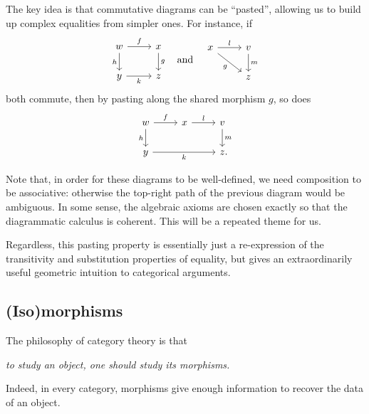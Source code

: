 The key idea is that commutative diagrams
can be ``pasted'', allowing us to build up complex equalities from simpler ones.
For instance, if
\[
  \begin{tikzcd}
    w\ar[r, "f"]\ar[d, "h"'] & x\ar[d, "g"] \\
    y\ar[r, "k"'] & z
  \end{tikzcd}\quad
  \text{and}\quad
  \begin{tikzcd}
    x\ar[r, "l"]\ar[rd, "g"'] & v\ar[d, "m"] \\
    & z
  \end{tikzcd}
\] both commute, then by pasting along the shared morphism $g$, so does
\[
  \begin{tikzcd}
    w\ar[r, "f"]\ar[d, "h"'] & x\ar[r, "l"] & v\ar[d, "m"] \\
    y\ar[rr, "k"'] && z\punctuation{.}
  \end{tikzcd}
\]

Note that, in order for these diagrams to be well-defined, we need composition
to be associative: otherwise the top-right path of the previous diagram would be
ambiguous. In some sense, the algebraic axioms are chosen exactly so that the
diagrammatic calculus is coherent. This will be a repeated theme for us.

Regardless, this pasting property is essentially just a re-expression of the
transitivity and substitution properties of equality, but gives an
extraordinarily useful geometric intuition to categorical arguments.

\subsection{(Iso)morphisms}

The philosophy of category theory is that \begin{center}
  \emph{to study an object, one should study its morphisms.}
\end{center}
Indeed, in every category, morphisms give enough information
to recover the data of an object.


